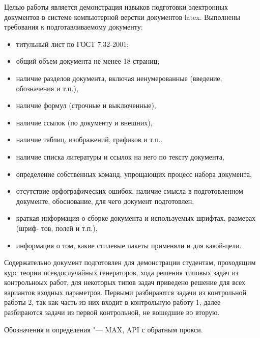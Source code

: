 \Introduction

Целью работы является демонстрация навыков подготовки электронных документов в системе компьютерной верстки документов latex. Выполнены требования к подготавливаемому документу:

\begin{itemize}
\item титульный лист по ГОСТ 7.32-2001;
\item общий объем документа не менее 18 страниц;
\item наличие разделов документа, включая ненумерованные (введение, обозначения и т.п.),
\item наличие формул (строчные и выключенные),
\item наличие ссылок (по документу и внешних),
\item наличие таблиц, изображений, графиков и т.п.,
\item наличие списка литературы и ссылок на него по тексту документа,
\item определение собственных команд, упрощающих процесс набора документа,
\item отсутствие орфографических ошибок, наличие смысла в подготовленном документе,
обоснование, для чего документ подготовлен,
\item краткая информация о сборке документа и используемых шрифтах, размерах (шриф-
тов, полей и т.п.),
\item информация о том, какие стилевые пакеты применяли и для какой-цели.
\end{itemize}

Содержательно документ подготовлен для демонстрации студентам, проходящим курс теории псевдослучайных генераторов, хода решения типовых задач из контрольноых работ, для некоторых типов задач приведено решение для всех вариантов входных параметров. Первыми разбираются задачи из контрольной работы 2, так как часть из них входит в контрольную работу 1, далее разбираются задачи из первой контрольной, не вошедшие во вторую.


Обозначения и определения "---
MAX, 
API 
с обратным прокси.
